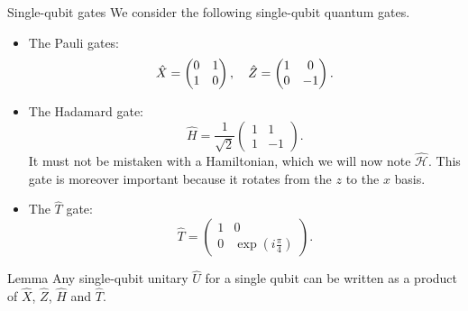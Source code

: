 \documentclass[a4paper]{article}
\begin{document}
\begin{parag}{Single-qubit gates}
    We consider the following single-qubit quantum gates.
    \begin{itemize}
        \item The Pauli gates:
        \[\hat{X} = \begin{pmatrix} 0 & 1 \\ 1 & 0 \end{pmatrix}, \quad \hat{Z} = \begin{pmatrix} 1 & 0 \\ 0 & -1 \end{pmatrix}.\]
        \item The Hadamard gate:
        \[\hat{H} = \frac{1}{\sqrt{2}} \begin{pmatrix} 1 & 1 \\ 1 & -1 \end{pmatrix}.\]
        It must not be mistaken with a Hamiltonian, which we will now note $\hat{\mathcal{H}}$. This gate is moreover important because it rotates from the $z$ to the $x$ basis. 
        \item The $\hat{T}$  gate: 
    \[\hat{T} = \begin{pmatrix} 1 & 0 \\ 0 & \exp\left(i\frac{\pi}{4}\right) \end{pmatrix}.\]
    \end{itemize}
\end{parag}

\begin{parag}{Lemma}
    Any single-qubit unitary $\hat{U}$ for a single qubit can be written as a product of $\hat{X}$, $\hat{Z}$, $\hat{H}$ and $\hat{T}$.
\end{parag}
\end{document}

